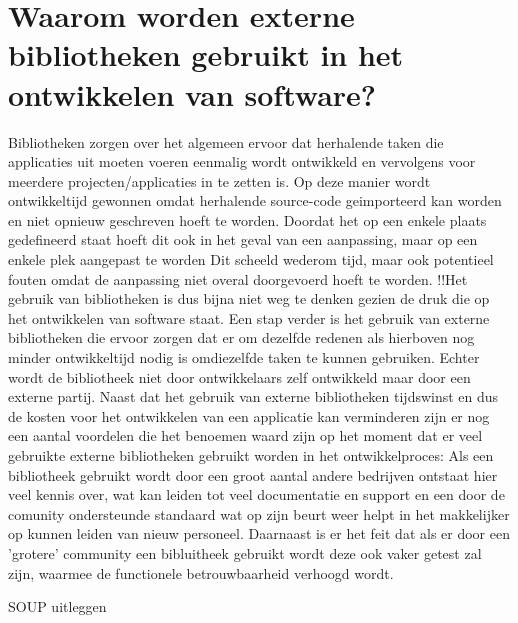 \section{Waarom worden externe bibliotheken gebruikt in het ontwikkelen van software?}\label{sec:waarom-worden-externe-bibliotheken-gebruikt-in-het-ontwikkelen-van-software?}
Bibliotheken zorgen over het algemeen ervoor dat herhalende taken die applicaties uit moeten voeren eenmalig wordt ontwikkeld en vervolgens voor meerdere projecten/applicaties in te zetten is. Op deze manier wordt ontwikkeltijd gewonnen omdat herhalende source-code geimporteerd kan worden en niet opnieuw geschreven hoeft te worden. Doordat het op een enkele plaats gedefineerd staat hoeft dit ook in het geval van een aanpassing, maar op een enkele plek aangepast te worden Dit scheeld wederom tijd, maar ook potentieel fouten omdat de aanpassing niet overal doorgevoerd  hoeft te worden. !!Het gebruik van bibliotheken is dus bijna niet weg te denken gezien de druk die op het ontwikkelen van software staat. Een stap verder is het gebruik van externe bibliotheken die ervoor zorgen dat er om dezelfde redenen als hierboven nog minder ontwikkeltijd nodig is omdiezelfde taken te kunnen gebruiken. Echter wordt de bibliotheek niet door ontwikkelaars zelf ontwikkeld maar door een externe partij. Naast dat het gebruik van externe bibliotheken tijdswinst en dus de kosten voor het ontwikkelen van een applicatie kan verminderen zijn er nog een aantal voordelen die het benoemen waard zijn op het moment dat er veel gebruikte externe bibliotheken gebruikt worden in het ontwikkelproces: Als een bibliotheek gebruikt wordt door een groot aantal andere bedrijven ontstaat hier veel kennis over, wat kan leiden tot veel documentatie en support en een door de comunity ondersteunde standaard wat op zijn beurt weer helpt in het makkelijker op kunnen leiden van nieuw personeel. Daarnaast is er het feit dat als er door een 'grotere' community een bibluitheek gebruikt wordt deze ook vaker getest zal zijn, waarmee de functionele betrouwbaarheid verhoogd wordt.

SOUP uitleggen


